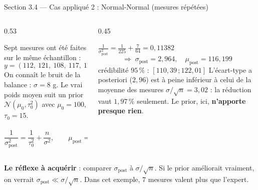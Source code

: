 \begin{frame}{Section 3.4 --- Cas appliqué 2 : Normal-Normal (mesures répétées)}
\small
\vspace{-1.5mm}
\begin{columns}[t]
\begin{column}{0.53\textwidth}
\begin{ebox}
Sept mesures ont été faites sur le même échantillon :
\[
y = (112,\ 121,\ 108,\ 117,\ 126,\ 115,\ 119)\ \mathrm{g},\qquad
\bar y = 116{,}857 .
\]
On connaît le bruit de la balance : $\sigma = 8$ g. Le vrai poids moyen suit un
prior $\mathcal{N}(\mu_0, \tau_0^2)$ avec $\mu_0 = 100$, $\tau_0 = 15$.
\end{ebox}
\begin{kbox}
\vspace{-1mm}
\[
\frac{1}{\sigma_{\text{post}}^2} = \frac{1}{\tau_0^2} + \frac{n}{\sigma^2},
\qquad
\mu_{\text{post}} = \sigma_{\text{post}}^2\left(\frac{\mu_0}{\tau_0^2} + \frac{n\bar y}{\sigma^2}\right)
\]
\end{kbox}
\end{column}
\begin{column}{0.45\textwidth}
\begin{solbox}
{\footnotesize
$\frac{1}{\sigma_{\text{post}}^2} = \frac{1}{225} + \frac{7}{64} = 0{,}11382$
\[
\Rightarrow\; \sigma_{\text{post}} = 2{,}964, \quad \mu_{\text{post}} = 116{,}199
\]
crédibilité $95\,\%$ : $[110{,}39\,;122{,}01]$
}
\vspace{1mm}
\footnotesize L'écart-type a posteriori ($2{,}96$) est à peine inférieur à celui
de la moyenne des mesures $\sigma/\sqrt n = 3{,}02$ : la réduction vaut
$1{,}97\,\%$ seulement. Le prior, ici, \textbf{n'apporte presque rien}.
\end{solbox}
\end{column}
\end{columns}
\vspace{1mm}
\begin{tcolorbox}[colback=byLight,colframe=byGrey!55,arc=2mm,width=.95\textwidth]
\centering\small
\textbf{Le réflexe à acquérir} : comparer $\sigma_{\text{post}}$ à $\sigma/\sqrt n$.
Si le prior améliorait vraiment, on verrait $\sigma_{\text{post}} \ll \sigma/\sqrt n$.
Dans cet exemple, $7$ mesures valent plus que l'expert.
\end{tcolorbox}
\end{frame}

